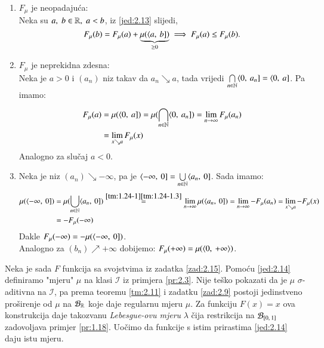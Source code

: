 \begin{rj}[\ref{zad:2.15}]  \label{rj:2.15}
    \begin{enumerate}[label=\arabic*.]
        \item $F_{\mu}$ je neopadaju\' ca:\\
        Neka su $a, \; b \in \mathbb{R}, \; a < b$, iz \eqref{jed:2.13} slijedi,
        \begin{equation*}
            F_\mu (b) = F_\mu (a) + \underbrace{\mu (\langle {a}, \: {b}])}_{\geq 0} \implies F_\mu (a) \leq F_\mu (b).
        \end{equation*}
        \item $F_\mu$ je neprekidna zdesna:\\
        Neka je $a > 0$ i $(a_n)$ niz takav da $a_n \searrow a$, tada vrijedi $\bigcap\limits_{n \in \mathbb{N}}^{} \langle {0}, \: {a_n}] = \langle {0}, \: {a}]$.
        Pa imamo:
        \begin{equation*}
            \begin{aligned}
                F_\mu (a) &= \mu(\langle {0}, \: {a}]) = \mu (\bigcap\limits_{n \in \mathbb{N}}^{} \langle {0}, \: {a_n}]) = \lim\limits_{n \to \infty} F_\mu (a_n)\\
                &= \lim_{x \searrow a} F_\mu (x)
            \end{aligned}
        \end{equation*}
        Analogno za slu\v caj $a < 0$.
        \item Neka je niz $(a_n) \searrow -\infty$, pa je $\langle {-\infty}, \: {0}] = \bigcup\limits_{n \in \mathbb{N}}^{} \langle {a_n}, \: {0}]$.
        Sada imamo:
        \begin{equation*}
            \begin{aligned}
                \mu (\langle {-\infty}, \: {0}]) &= \mu (\bigcup\limits_{n \in \mathbb{N}}^{} \langle {a_n}, \: {0}]) \overset{\ref{tm:1.24-1} \ref{tm:1.24-1.3}}{=} \lim\limits_{n \to \infty} \mu({\langle {a_n}, \: {0}]}) = \lim\limits_{n \to \infty} - F_\mu (a_n) = \lim\limits_{x \searrow a} - F_\mu (x)\\
                &= - F_\mu (-\infty)
            \end{aligned}
        \end{equation*}
        Dakle $F_\mu (-\infty) = - \mu (\langle {-\infty}, \: {0}])$.\\
        Analogno za $(b_n) \nearrow +\infty$ dobijemo:
        $F_\mu (+\infty) = \mu (\langle {0}, \: {+\infty} \rangle)$.
    \end{enumerate}
\end{rj}

Neka je sada $F$ funkcija sa svojstvima iz zadatka \ref{zad:2.15}.
Pomo\' cu \eqref{jed:2.14} definiramo "mjeru" $\mu$ na klasi $\mathcal{I}$ iz primjera \eqref{pr:2.3}.
Nije te\v sko pokazati da je $\mu$ $\sigma$-aditivna na $\mathcal{I}$, pa prema teoremu \ref{tm:2.11} i zadatku \ref{zad:2.9} postoji jedinstveno pro\v sirenje od $\mu$ na $\mathcal{B}_{\mathbb{R}}$ koje daje regularnu mjeru $\mu$.
Za funkciju $F(x) = x$ ova konstrukcija daje takozvanu \emph{Lebesgue-ovu mjeru} $\lambda$ \v cija restrikcija na $\mathcal{B}_{[{0}, \:{1}]}$ zadovoljava primjer \ref{pr:1.18}.
Uo\v cimo da funkcije s istim prirastima \eqref{jed:2.14} daju istu mjeru.